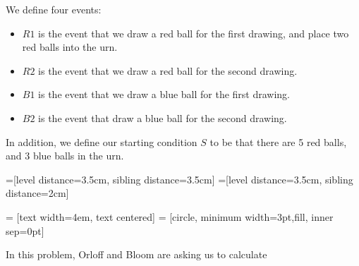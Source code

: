 \documentclass[a4paper,11pt]{article}
\begin{document}
We define four events:
\begin{itemize}
  \item $R1$ is the event that we draw a red ball for the first drawing, 
  and place two red balls into the urn.

  \item $R2$ is the event that we draw a red ball for the second 
    drawing.

  \item $B1$ is the event that we draw a blue ball for the first 
    drawing.

  \item $B2$ is the event that draw a blue ball for the second drawing.
\end{itemize}

In addition, we define our starting condition $S$ to be that there
are 5 red balls, and 3 blue balls in the urn.

=[level distance=3.5cm, sibling distance=3.5cm]
=[level distance=3.5cm, sibling distance=2cm]

 = [text width=4em, text centered]
 = [circle, minimum width=3pt,fill, inner sep=0pt]


In this problem, Orloff and Bloom are asking us to calculate 
\end{document}
